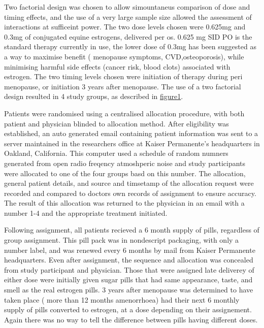 \documentclass[11pt]{article}
\begin{document}
		Two factorial design was chosen to allow simountaneus comparison of dose and timing effects, and the use of a very large sample size allowed the assessment of interactions at sufficeint power. 
		The two dose levels chosen were 0.625mg and 0.3mg of conjugated equine estrogens, delivered per os.
		0.625 mg SID PO is the standard therapy currently in use, the lower dose of 0.3mg has been suggested as a way to maximise benefit ( menopause symptoms, CVD,osteoporosis), while minimising harmful side effects (cancer risk, blood clots)  associated with estrogen.
		The two timing levels chosen were initiation of therapy during peri menopause, or initiation 3 years after menopause.
		The use of a two factorial design resulted in 4 study groups, as described in \hyperref[Figure 1]{figure1}.


		Patients were randomised using a centralised allocation procedure, with both patient and physician blinded to allocation method. 
		After eligibility was established, an auto generated email containing patient information was sent to a server maintained in the researchers office at Kaiser Permanente's headquarters in Oakland, California. 
		This computer used a schedule of random numners generated from open radio freqency atmoshperic noise \cite{Eddelbuettel2009}  and study participants were allocated to one of the four groups basd on this number.
		The allocation, general patient details, and source and timsetamp of the allocation request were recorded and compared to doctors own records of assignment to ensure accuracy.
		The result of this allocation was returned to the physician in an email with a number 1-4 and the appropriate treatment initiated.


		Following assignment, all patients recieved a 6 month supply of pills, regardless of group assignment.
		This pill pack was in nondescript packaging, with only a number label, and was renewed every 6 months by mail from Kaiser Permanente headquarters.
		Even after assignment, the sequence and allocation was concealed from study participant and physician.
		Those that were assigned late deliverey of either dose were initially given sugar pills that had same appearance, taste, and smell as the real estrogen pills. 
		3 years after menopause was determined to have taken place ( more than 12 months amenorrhoea) had their next 6 monthly supply of pills converted to estrogen, at a dose depending on their assignement. Again there was no way to tell the difference between pills having different doses.
\end{document}
